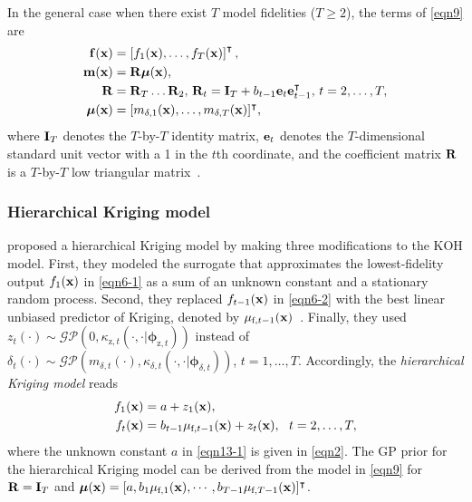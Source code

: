 \documentclass[journal ]{new-aiaa}
\begin{document}
In the general case when there exist $T$ model fidelities ($T \geq 2$), the terms of \cref{eqn9} are
\begin{subequations}\label{eqn12}
	\begin{align}
		{\bf f}({\bf x}) & = \left[f_1({\bf x}),\dots,f_T({\bf x})\right]^\intercal, \label{eqn12-1}\\
		{\bf m}({\bf x}) & = {\bf R} \boldsymbol{\mu}({\bf x}), \label{eqn12-2}\\
		{\bf R} & = {\bf R}_T\dots {\bf R}_2, \, {\bf R}_t = {\bf I}_T + b_{t-1} {\bf e}_t {\bf e}^\intercal_{t-1}, \, t=2,\dots,T, \label{eqn12-3}\\
 		\boldsymbol{\mu}({\bf x}) & = [m_{\delta,1}({\bf x}),\dots,m_{\delta,T}({\bf x})]^\intercal \label{eqn12-4},
	\end{align}
\end{subequations}
where ${\bf I}_T$ denotes the $T$-by-$T$ identity matrix, ${\bf e}_t$ denotes the $T$-dimensional standard unit vector with a 1 in the $t$th coordinate, and the coefficient matrix ${\bf R}$ is a $T$-by-$T$ low triangular matrix~\citep{Garland2020}.

\subsubsection{Hierarchical Kriging model}\label{Sec422}

\citet{Han2012} proposed a hierarchical Kriging model by making three modifications to the KOH model.
First, they modeled the surrogate that approximates the lowest-fidelity output $f_1({\bf x})$ in \cref{eqn6-1} as a sum of an unknown constant and a stationary random process.
Second, they replaced $f_{t-1}({\bf x})$ in \cref{eqn6-2} with the best linear unbiased predictor of Kriging, denoted by $\mu_{\text{f},t-1}({\bf x})$~\citep{Sacks1989}.
Finally, they used $z_t({\cdot}) \sim \mathcal{GP}\left(0,\kappa_{\text{z},t}(\cdot,\cdot|{\boldsymbol \phi}_{\text{z},t})\right)$ instead of $\delta_{t}(\cdot) \sim \mathcal{GP}\left(m_{\delta,t}(\cdot),\kappa_{\delta,t}(\cdot,\cdot|{\boldsymbol \phi}_{\delta,t})\right)$, $t=1,\dots,T$.
Accordingly, the \textit{hierarchical Kriging model} reads
\begin{subequations}\label{eqn13}
	\begin{align}
		f_1({\bf x}) & = a + z_1({\bf x}) 
		\label{eqn13-1},\\
		f_t({\bf x}) & =
		b_{t-1} \mu_{\text{f},t-1}({\bf x}) + z_{t}({\bf x}), \ \  t=2,\dots,T
		\label{eqn13-2},
	\end{align}
\end{subequations}
where the unknown constant $a$ in \cref{eqn13-1} is given in \cref{eqn2}.
The GP prior for the hierarchical Kriging model can be derived from the model in \cref{eqn9} for ${\bf R}={\bf I}_T$ and $\boldsymbol{\mu}({\bf x}) = [a,b_1 \mu_{\text{f},1}({\bf x}),\cdots,b_{T-1} \mu_{\text{f},T-1}({\bf x})]^\intercal$.
\end{document}
